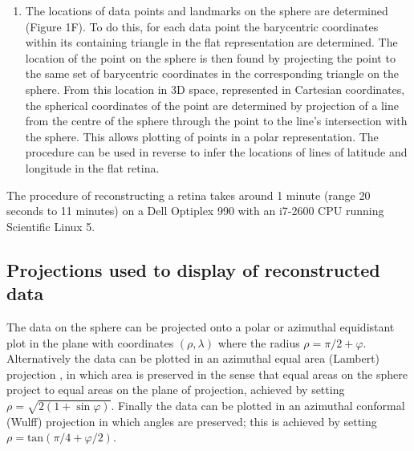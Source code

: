 \documentclass[10pt]{article}
\newcounter{Figure}
\begin{document}
\begin{enumerate}
\begin{equation}
_2\cos \left(\lambda _1-\lambda _2\right)+\sin \varphi
_1\sin \varphi _2\right)
\end{equation}
  where  $\varphi _1$ and  $\varphi _2$ are the latitudes of
the vertices and  $\lambda _1$ and  $\lambda _2$ are the longitudes.
The derivatives of  $E$ with respect to  $\varphi _i$ and  $\lambda
_i$ are computed and used to minimise  $E$.  Optimisation proceeds
by: (i)~turning off the area penalty  $\beta =0$ and using the FIRE
structural relaxation algorithm \cite{BitzekEtal2006};  (ii)~starting
from this configuration, setting   $\beta =8$ and  $\nu =1$ and again
using FIRE to minimise the energy, which removes a number of the
flipped triangles, dealing preferentially with the biggest; and
(iii)~minimising using the BFGS quasi-Newton method (as implemented
in the R optim function) with  $\beta =8$  and  $\nu =0.5$ to refine
the optimisation. This procedure was arrived at after trials on a
corpus of over 200 marked-up retinae.
\item The locations of data points and landmarks on the sphere are
determined (Figure 1F). To do this, for each data point the
barycentric coordinates within its containing triangle in the flat
representation are determined. The location of the point on the
sphere is then found by projecting the point to the same set of
barycentric coordinates in the corresponding triangle on the sphere.
From this location in 3D space, represented in Cartesian coordinates,
the spherical coordinates of the point are determined by projection
of a line from the centre of the sphere through the point to the
line's intersection with the sphere. This allows plotting of points
in a polar representation. The procedure can be used in reverse to
infer the locations of lines of latitude and longitude in the flat
retina.
\end{enumerate}
The procedure of reconstructing a retina takes around 1 minute (range
20 seconds to 11 minutes) on a Dell Optiplex 990 with an i7-2600 CPU
running Scientific Linux 5.  

\subsection*{Projections used to display of reconstructed data}
The data on the sphere can be projected onto a polar or azimuthal
equidistant plot in the plane with coordinates  $(\rho ,\lambda )$
where the radius  $\rho =\pi /2+\varphi $. Alternatively the data can
be plotted in an azimuthal equal area (Lambert) projection \cite{FisherEtal1987}, in which area is preserved in the sense that equal areas
on the sphere project to equal areas on the plane of projection,
achieved by setting  $\rho =\sqrt{2(1+\sin \varphi )}$.  Finally
the data can be plotted in an azimuthal conformal (Wulff) projection
in which angles are preserved; this is achieved by setting   $\rho
=\text{tan}\left(\pi /4+\varphi /2\right)$. 
\end{document}
